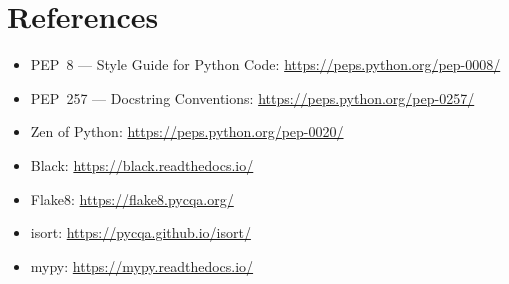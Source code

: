 \documentclass[11pt]{article}
\begin{document}
\section{References}

\begin{itemize}[label={-},leftmargin=2em,labelsep=0.6em,itemsep=0.2em]
  \item PEP~8 --- Style Guide for Python Code: \url{https://peps.python.org/pep-0008/}
  \item PEP~257 --- Docstring Conventions: \url{https://peps.python.org/pep-0257/}
  \item Zen of Python: \url{https://peps.python.org/pep-0020/}
  \item Black: \url{https://black.readthedocs.io/}
  \item Flake8: \url{https://flake8.pycqa.org/}
  \item isort: \url{https://pycqa.github.io/isort/}
  \item mypy: \url{https://mypy.readthedocs.io/}
\end{itemize}
\end{document}
